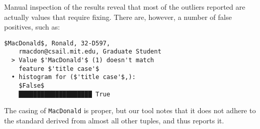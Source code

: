 Manual inspection of the results reveal that most of the outliers reported are actually values that require fixing. There are, however, a number of false positives, such as:

\begin{lstlisting}[gobble=2]
  $MacDonald$, Ronald, 32-D597, 
    rmacdon@csail.mit.edu, Graduate Student    
  > Value $'MacDonald'$ (1) doesn't match 
    feature $'title case'$  
  • histogram for ($'title case'$,):
    $False$
    ████████████████████ True
\end{lstlisting}

The casing of \lstinline{MacDonald} is proper, but our tool notes that it does not adhere to the standard derived from almost all other tuples, and thus reports it. 
